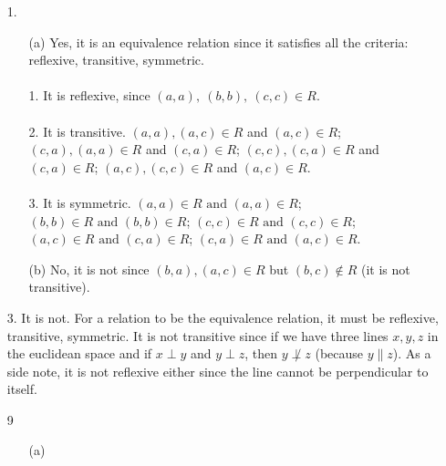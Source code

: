\documentclass[12pt, a4paper]{article}
\begin{document}
\begin{itemize}
\item[1.]
\begin{itemize}
\item[(a)]
Yes, it is an equivalence relation since it satisfies all the criteria: reflexive, transitive, symmetric.\\\\
1. It is reflexive, since $(a, a), \ (b, b), \ (c, c) \in R$.\\\\
2. It is transitive. $(a, a), (a,c) \in R$ and $(a, c) \in R$; $(c, a), (a, a) \in R$ and $(c, a) \in R$;
$(c, c), (c, a) \in R$ and $(c, a) \in R$; $(a, c), (c, c) \in R$ and $(a, c) \in R$.\\\\
3. It is symmetric. $(a, a) \in R \mbox{ and } (a, a) \in R$; $(b, b) \in R \mbox{ and } (b, b) \in R$;
$(c, c) \in R \mbox{ and } (c, c) \in R$; $(a, c) \in R \mbox{ and } (c, a) \in R$; $(c, a) \in R \mbox{ and } (a, c) \in R$.

\item[]

\item[(b)]
No, it is not since $(b, a), (a, c) \in R$ but $(b, c) \notin R$ (it is not transitive).
\end{itemize}

\item[]
\item[]

\item[3.]
It is not. For a relation to be the equivalence relation, it must be reflexive, transitive, symmetric.
It is not transitive since if we have three lines $x, y, z$ in the euclidean space and if $x \perp y$ and $y \perp z$,
then $y \not\perp z$ (because $y \parallel z$). As a side note, it is not reflexive either since the line cannot be perpendicular to itself.

\item[]
\item[]

\item[9]
\begin{itemize}
\item[(a)]

\end{itemize}
\end{itemize}
\end{document}
